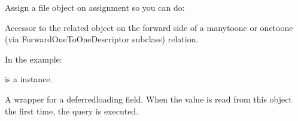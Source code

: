 \documentclass[letterpaper,10pt,spanish]{sphinxmanual}
\begin{document}
\begin{fulllineitems}
\begin{fulllineitems}
\sphinxAtStartPar
Assign a file object on assignment so you can do:

\begin{sphinxVerbatim}[commandchars=\\\{\}]
   
      
\end{sphinxVerbatim}

\end{fulllineitems}



\begin{fulllineitems}

\pysigstartsignatures
{}
\pysigstopsignatures
\sphinxAtStartPar
Accessor to the related object on the forward side of a many\sphinxhyphen{}to\sphinxhyphen{}one or
one\sphinxhyphen{}to\sphinxhyphen{}one (via ForwardOneToOneDescriptor subclass) relation.

\sphinxAtStartPar
In the example:

\begin{sphinxVerbatim}[commandchars=\\\{\}]
 
       
\end{sphinxVerbatim}

\sphinxAtStartPar
{} is a  instance.

\end{fulllineitems}



\begin{fulllineitems}

\pysigstartsignatures
{}
\pysigstopsignatures
\end{fulllineitems}



\begin{fulllineitems}

\pysigstartsignatures
{}
\pysigstopsignatures
\sphinxAtStartPar
A wrapper for a deferred\sphinxhyphen{}loading field. When the value is read from this
object the first time, the query is executed.


\end{fulllineitems}
\end{fulllineitems}
\end{document}
